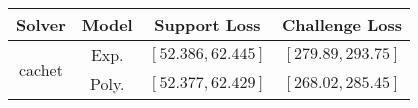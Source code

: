 \begin{tabular}{cc|c|c} 
\hline 
 Solver & Model & Support Loss  & Challenge Loss \tabularnewline\hline 
\hline 
\multirow{2}{*}{cachet} & Exp. & $\left[52.386,62.445\right]$ & $\left[279.89,293.75\right]$ \tabularnewline 
 & Poly. & $\left[52.377,62.429\right]$ & $\left[268.02,285.45\right]$ \tabularnewline 
\hline 
\end{tabular} 

